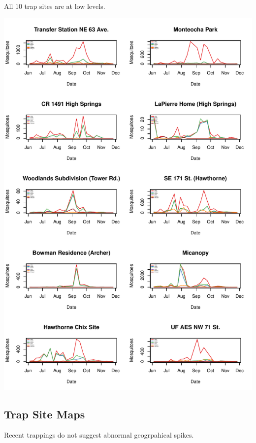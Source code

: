 \documentclass{article}
\begin{document}
All 10 trap sites are at low levels.
\begin{center}
\includegraphics{mosq08nov13-006}
\end{center}
\newpage

\begin{center}
\section*{Trap Site Maps}

\end{center}

Recent trappings do not suggest abnormal geogrpahical spikes.
\end{document}
